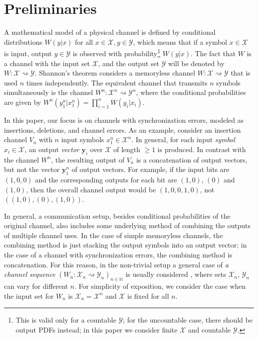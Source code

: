 \documentclass[journal, twocol]{IEEEtran}
\newcommand{\bN}{{\mathbb{N}}}
\newcommand{\mX}{{\mathcal{X}}}
\newcommand{\mY}{{\mathcal{Y}}}
\newcommand{\tosq}{\rightsquigarrow}
\newcommand{\vc}[1]{\mathbf{#1}}
\begin{document}
\section{Preliminaries}
\label{s:prelim}

A mathematical model of a physical channel is defined by conditional distributions $W(y|x)$ for all $x\in \mX, y\in\mY$, which means that if a symbol $x\in\mX$ is input, output $y\in\mY$ is observed with probability\footnote{This is valid only for a countable $\mY$; for the uncountable case, there should be output PDFs instead; in this paper we consider finite $\mX$ and countable $\mY$.} $W(y|x)$.
The fact that $W$ is a channel with the input set $\mX$, and the output set $\mY$ will be denoted by $W:\mX\tosq\mY$. Shannon's theorem \cite{shannon48mathematical} considers a memoryless channel $W:\mX\tosq\mY$ that is used $n$ times independently.
The equivalent channel that transmits $n$ symbols simultaneously is the channel $W^n:\mX^n\tosq\mY^n$, where the conditional probabilities are given by $W^n(y_1^n|x_1^n)=\prod_{i=1}^n W(y_i|x_i)$.

In this paper, our focus is on channels with synchronization errors, modeled as insertions, deletions, and channel errors. As an example, consider an insertion channel $V_n$ with $n$ input symbols $x_1^n\in\mX^n$.
In general, for each input \emph{symbol} $x_i\in\mX$, an output \emph{vector} $\vc{y}_i$ over $\mX$ of length $\geq 1$ is produced. In contrast with the channel $W^n$, the resulting output of $V_n$ is a concatenation of output vectors, but not the vector $\vc{y}_1^n$ of output vectors. For example, if the input bits are $(1,0,0)$ and the corresponding outputs for each bit are $(1,0)$, $(0)$ and $(1,0)$, then the overall channel output would be $(1,0,0,1,0)$, not $((1,0), (0), (1,0))$.

In general, a communication setup, besides conditional probabilities of the original channel, also includes some underlying method of combining the outputs of multiple channel uses. 
In the case of simple memoryless channels, the combining method is just stacking the output symbols into an output vector; in the case of a channel with synchronization errors, the combining method is concatenation. 
For this reason, in the non-trivial setup a general case of \emph{a channel sequence} $(W_n:\mX_n\tosq\mY_n)_{n\in\bN}$ is usually considered \cite{hu62shannon, verdu94general}, where sets $\mX_n$, $\mY_n$ can vary for different $n$.
For simplicity of exposition, we consider the case when the input set for $W_n$ is $\mX_n=\mX^n$ and $\mX$ is fixed for all $n$.
\end{document}
